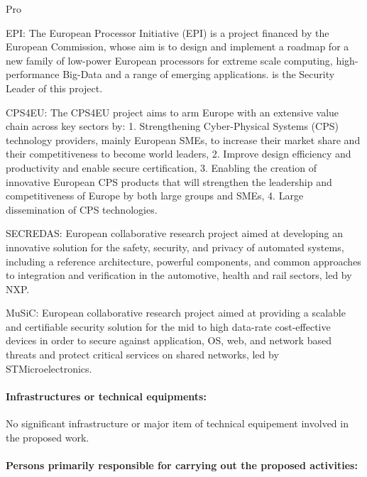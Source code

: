 \begin{sitedescription}{Pro}
\begin{compactitem}
\item EPI: The European Processor Initiative (EPI) is a project
  financed by the European Commission, whose aim is to design and
  implement a roadmap for a new family of low-power European
  processors for extreme scale computing, high-performance Big-Data
  and a range of emerging applications. \provenrun{} is the Security
  Leader of this project.
\item CPS4EU: The CPS4EU project aims to arm Europe with an extensive
  value chain across key sectors by: 1. Strengthening Cyber-Physical
  Systems (CPS) technology providers, mainly European SMEs, to
  increase their market share and their competitiveness to become
  world leaders, 2. Improve design efficiency and productivity and
  enable secure certification, 3. Enabling the creation of innovative
  European CPS products that will strengthen the leadership and
  competitiveness of Europe by both large groups and SMEs, 4. Large
  dissemination of CPS technologies.
\item SECREDAS: European collaborative research project aimed at
  developing an innovative solution for the safety, security, and
  privacy of automated systems, including a reference architecture,
  powerful components, and common approaches to integration and
  verification in the automotive, health and rail sectors, led by
  NXP.
\item MuSiC: European collaborative research project aimed at
  providing a scalable and certifiable security solution for the mid
  to high data-rate cost-effective devices in order to secure against
  application, OS, web, and network based threats and protect critical
  services on shared networks, led by STMicroelectronics.
\end{compactitem}

\paragraph{Infrastructures or technical equipments:}


No significant infrastructure or major item of technical equipement
involved in the proposed work.

\paragraph{Persons primarily responsible for carrying out the proposed activities:}


\end{sitedescription}
